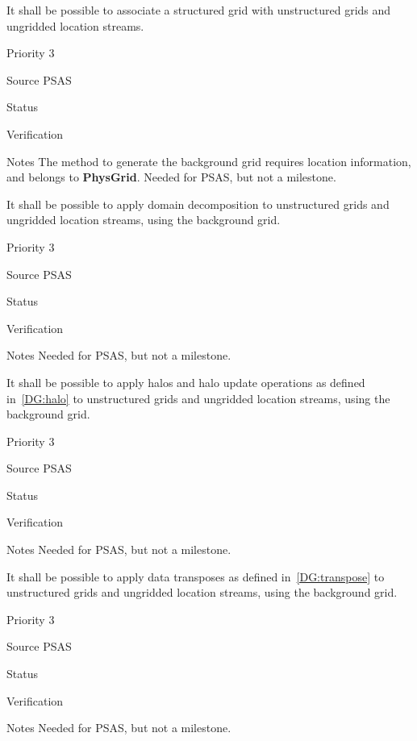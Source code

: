 
It shall be possible to associate a structured grid with unstructured
grids and ungridded location streams.

\begin{reqlist}
\item[Priority] 3
\item[Source] PSAS
\item[Status]
\item[Verification]
\item[Notes] The method to generate the background grid requires
  location information, and belongs to \textbf{PhysGrid}.  Needed
  for PSAS, but not a milestone.
\end{reqlist}


It shall be possible to apply domain decomposition to unstructured
grids and ungridded location streams, using the background grid.

\begin{reqlist}
\item[Priority] 3
\item[Source] PSAS
\item[Status] 
\item[Verification]
\item[Notes]  Needed for PSAS, but not a milestone.
\end{reqlist}


It shall be possible to apply halos and halo update operations as
defined in~\ref{DG:halo} to unstructured grids and ungridded location
streams, using the background grid.

\begin{reqlist}
\item[Priority] 3
\item[Source] PSAS
\item[Status]
\item[Verification]
\item[Notes] Needed for PSAS, but not a milestone.
\end{reqlist}


It shall be possible to apply data transposes as defined
in~\ref{DG:transpose} to unstructured grids and ungridded location
streams, using the background grid.

\begin{reqlist}
\item[Priority] 3
\item[Source] PSAS
\item[Status]
\item[Verification]
\item[Notes] Needed for PSAS, but not a milestone.
\end{reqlist}






